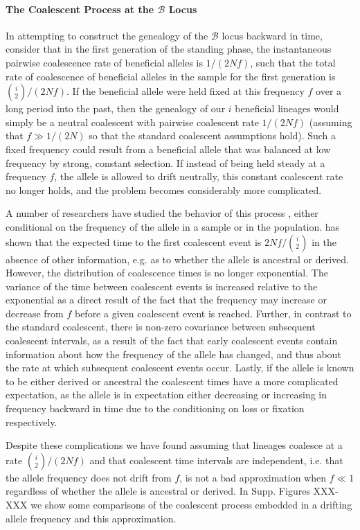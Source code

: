\documentclass[a4paper,10pt]{article}
\newcommand{\fancyB}{$\mathcal B$ }
\begin{document}
\paragraph{The Coalescent Process at the \fancyB Locus}

In attempting to construct the genealogy of the \fancyB locus backward in time, consider that in the first generation of the standing phase, the instantaneous pairwise coalescence rate of beneficial alleles is $1/\left(2Nf\right)$, such that the total rate of coalescence of beneficial alleles in the sample for the first generation is ${i \choose 2}/\left(2Nf\right)$. If the beneficial allele were held fixed at this frequency $f$ over a long period into the past, then the genealogy of our $i$ beneficial lineages would simply be a neutral coalescent with pairwise coalescent rate $1/(2 N f)$ (assuming that $f \gg 1/(2N)$ so that the standard coalescent assumptions hold). Such a fixed frequency could result from a beneficial allele that was balanced at low frequency by strong, constant selection. If instead of being held steady at a frequency $f$, the allele is allowed to drift neutrally, this constant coalescent rate no longer holds, and the problem becomes considerably more complicated.

A number of researchers have studied the behavior of this process \citep{XXXX}, either conditional on the frequency of the allele in a sample or in the population. \cite{Wiuf:2000js} has shown that the expected time to the first coalescent event is $2 N f/ {i \choose 2}$ in the absence of other information, e.g. as to whether the allele is ancestral or derived. However, the distribution of coalescence times is no longer exponential. The variance of the time between coalescent events is increased relative to the exponential as a direct result of the fact that the frequency may increase or decrease from $f$ before a given coalescent event is reached. Further, in contrast to the standard coalescent, there is non-zero covariance between subsequent coalescent intervals, as a result of the fact that early coalescent events contain information about how the frequency of the allele has changed, and thus about the rate at which subsequent coalescent events occur. Lastly, if the allele is known to be either derived or ancestral the coalescent times have a more complicated expectation, as the allele is in expectation either decreasing or increasing in frequency backward in time due to the conditioning on loss or fixation respectively.

Despite these complications we have found assuming that lineages coalesce at a rate $ {i \choose 2}/(2 N f)$ and that coalescent time intervals are independent, i.e. that the allele frequency does not drift from $f$, is not a bad approximation when $f \ll 1$ regardless of whether the allele is ancestral or derived. In Supp. Figures XXX-XXX we show some comparisons of the coalescent process embedded in a drifting allele frequency and this approximation. 
\end{document}
